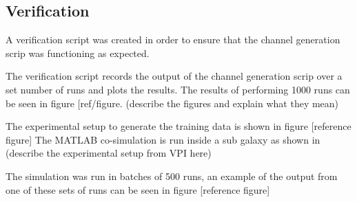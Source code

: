 \subsection{Verification}	
A verification script was created in order to ensure that the channel generation scrip was functioning as expected.

The verification script records the output of the channel generation scrip over a set number of runs and plots the results. The results of performing 1000 runs can be seen in figure [ref/figure. (describe the figures and explain what they mean)



The experimental setup to generate the training data is shown in figure [reference figure]
The MATLAB co-simulation is run inside a sub galaxy as shown in 
(describe the experimental setup from VPI here)

The simulation was run in batches of 500 runs, an example of the output from one of these sets of runs can be seen in figure [reference figure]


